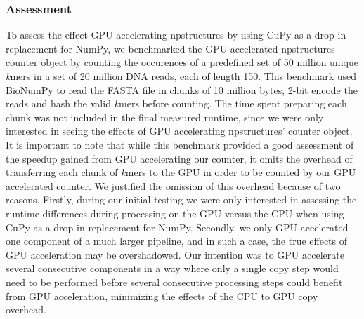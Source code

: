 \subsubsection{Assessment} \label{methods:initial_testing:assessment}
To assess the effect GPU accelerating npstructures by using CuPy as a drop-in replacement for NumPy, we benchmarked the GPU accelerated npstructures counter object by counting the occurences of a predefined set of 50 million unique \textit{k}mers in a set of 20 million DNA reads, each of length 150.
This benchmark used BioNumPy to read the FASTA file in chunks of 10 million bytes, 2-bit encode the reads and hash the valid \textit{k}mers before counting.
The time spent preparing each chunk was not included in the final measured runtime, since we were only interested in seeing the effects of GPU accelerating npstructures' counter object.
It is important to note that while this benchmark provided a good assessment of the speedup gained from GPU accelerating our counter, it omits the overhead of transferring each chunk of \textit{k}mers to the GPU in order to be counted by our GPU accelerated counter.
We justified the omission of this overhead because of two reasons.
Firstly, during our initial testing we were only interested in assessing the runtime differences during processing on the GPU versus the CPU when using CuPy as a drop-in replacement for NumPy.
Secondly, we only GPU accelerated one component of a much larger pipeline, and in such a case, the true effects of GPU acceleration may be overshadowed.
Our intention was to GPU accelerate several consecutive components in a way where only a single copy step would need to be performed before several consecutive processing steps could benefit from GPU acceleration, minimizing the effects of the CPU to GPU copy overhead.


